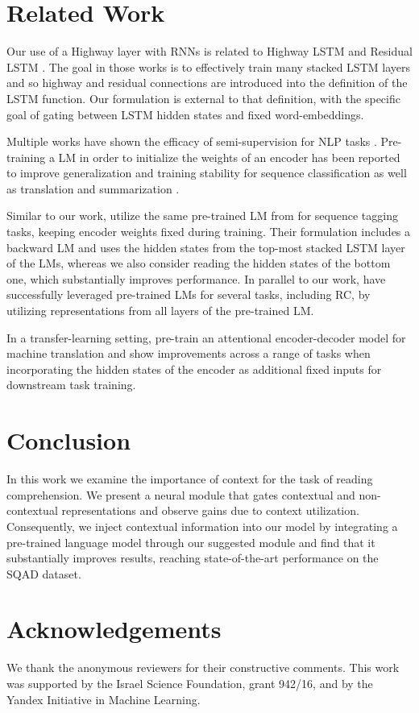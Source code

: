 \documentclass[11pt,a4paper]{article}
\newcommand{\squad}{\textsc{SQ\normalfont{u}AD}}
\newcommand{\lstm}{\textsc{LSTM}}
\newcommand{\rnn}{\textsc{RNN}}
\begin{document}
\section{Related Work}

Our use of a Highway layer with \rnn{}s is related to Highway \lstm{} \cite{DBLP:conf/icassp/ZhangCYYKG16} and Residual \lstm{} \cite{DBLP:journals/corr/KimEL17}. The goal in those works is to effectively train many stacked \lstm{} layers and so highway and residual connections are introduced 
into the definition of the  \lstm{} function. 
Our formulation is external to that definition, with the specific goal of gating between \lstm{} hidden states and fixed word-embeddings.

Multiple works have shown the efficacy of semi-supervision for NLP tasks \cite{anders2013}. Pre-training a LM in order to initialize the weights of an encoder has been reported to improve generalization and training stability for sequence classification \citep{DBLP:conf/nips/DaiL15} as well as translation and summarization \citep{DBLP:conf/emnlp/RamachandranLL17}.

Similar to our work, \citet{DBLP:journals/corr/PetersABP17} utilize the same pre-trained LM from \citet{jozefowicz2016} for sequence tagging tasks, keeping encoder weights fixed during training. Their formulation includes a backward LM and uses the hidden states from the top-most stacked \lstm{} layer of the LMs, whereas we also consider reading the hidden states of the bottom one, which substantially improves performance.
In parallel to our work, \citet{DBLP:journals/corr/abs-1802-05365} have successfully leveraged pre-trained LMs for several tasks, including RC, by utilizing representations from all layers of the pre-trained LM.

In a transfer-learning setting, \citet{DBLP:conf/nips/McCannBXS17} pre-train an attentional encoder-decoder model for machine translation and show improvements across a range of tasks when incorporating the hidden states of the encoder as additional fixed inputs for downstream task training.
 \section{Conclusion}

In this work we examine the importance of context for the task of reading comprehension. We present a neural module that gates contextual and non-contextual representations and observe gains due to context utilization. Consequently, we  inject contextual information into our model by integrating a pre-trained language model through our suggested module and find that it substantially improves results, reaching state-of-the-art performance on the \squad{} dataset.
 \section*{Acknowledgements}
We thank the anonymous reviewers for their constructive comments. This work was supported by the Israel Science Foundation, grant 942/16, and by the Yandex Initiative in Machine Learning. 


\end{document}

